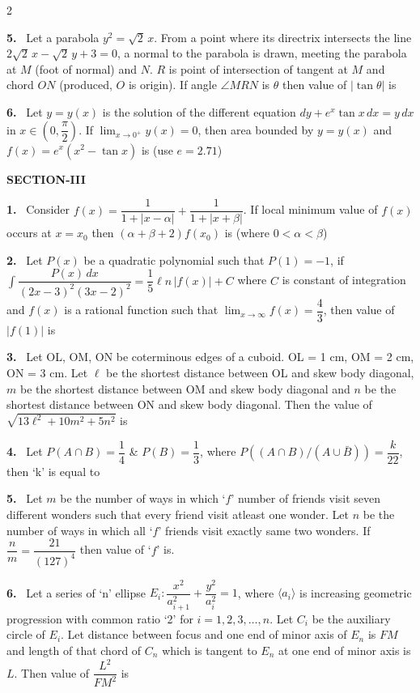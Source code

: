 \documentclass[10pt]{extarticle}
\newcommand{\sect}[1]{\par\smallskip\noindent\textbf{#1}\par}
\newcommand{\qn}[1]{\par\smallskip\noindent\textbf{#1.}~}
\begin{document}
\begin{multicols}{2}
\qn{5} Let a parabola $y^2=\sqrt2\,x$. From a point where its directrix intersects the line $2\sqrt2\,x-\sqrt2\,y+3=0$, a normal to the parabola is drawn, meeting the parabola at $M$ (foot of normal) and $N$. $R$ is point of intersection of tangent at $M$ and chord $ON$ (produced, $O$ is origin). If angle $\angle MRN$ is $\theta$ then value of $|\tan\theta|$ is

\qn{6} Let $y=y(x)$ is the solution of the different equation $dy+e^x\tan x\,dx=y\,dx$ in $x\in\left(0,\dfrac\pi2\right)$. If $\displaystyle\lim_{x\to0^+}y(x)=0$, then area bounded by $y=y(x)$ and $f(x)=e^x(x^2-\tan x)$ is (use $e=2.71$)

\sect{SECTION-III}
\qn{1} Consider $f(x)=\dfrac{1}{1+|x-\alpha|}+\dfrac{1}{1+|x+\beta|}$. If local minimum value of $f(x)$ occurs at $x=x_0$ then $(\alpha+\beta+2)f(x_0)$ is (where $0<\alpha<\beta$)

\qn{2} Let $P(x)$ be a quadratic polynomial such that $P(1)=-1$, if $\displaystyle\int\dfrac{P(x)\,dx}{(2x-3)^2(3x-2)^2}=\dfrac15\ell n\,|f(x)|+C$ where $C$ is constant of integration and $f(x)$ is a rational function such that $\displaystyle\lim_{x\to\infty}f(x)=\dfrac43$, then value of $|f(1)|$ is

\qn{3} Let OL, OM, ON be coterminous edges of a cuboid. OL = 1 cm, OM = 2 cm, ON = 3 cm. Let $\ell$ be the shortest distance between OL and skew body diagonal, $m$ be the shortest distance between OM and skew body diagonal and $n$ be the shortest distance between ON and skew body diagonal. Then the value of $\sqrt{13\ell^2+10m^2+5n^2}$ is

\qn{4} Let $P(A\cap B)=\dfrac14$ \& $P(B)=\dfrac13$, where $P\left((A\cap B)/(A\cup\bar B)\right)=\dfrac{k}{22}$, then `k' is equal to

\qn{5} Let $m$ be the number of ways in which `$f$' number of friends visit seven different wonders such that every friend visit atleast one wonder. Let $n$ be the number of ways in which all `$f$' friends visit exactly same two wonders. If $\dfrac nm=\dfrac{21}{(127)^4}$ then value of `$f$' is.

\qn{6} Let a series of `n' ellipse $E_i:\dfrac{x^2}{a_{i+1}^2}+\dfrac{y^2}{a_i^2}=1$, where $\langle a_i\rangle$ is increasing geometric progression with common ratio `2' for $i=1,2,3,\ldots,n$. Let $C_i$ be the auxiliary circle of $E_i$. Let distance between focus and one end of minor axis of $E_n$ is $FM$ and length of that chord of $C_n$ which is tangent to $E_n$ at one end of minor axis is $L$. Then value of $\dfrac{L^2}{FM^2}$ is
\end{multicols}
\end{document}
